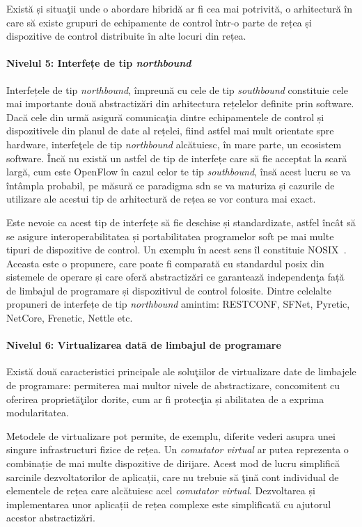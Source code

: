 Există și situaţii unde o abordare hibridă ar fi cea mai potrivită, o arhitectură în care să existe grupuri de echipamente de control într-o parte de rețea și dispozitive de control distribuite în alte locuri din rețea.

\paragraph{Nivelul 5: Interfețe de tip \textit{northbound}}

Interfețele de tip \textit{northbound}, împreună cu cele de tip \textit{southbound} constituie cele mai importante două abstractizări din arhitectura rețelelor definite prin software. Dacă cele din urmă asigură comunicaţia dintre echipamentele de control și dispozitivele din planul de date al rețelei, fiind astfel mai mult orientate spre hardware, interfeţele de tip \textit{northbound} alcătuiesc, în mare parte, un ecosistem software. Încă nu există un astfel de tip de interfețe care să fie acceptat la scară largă, cum este OpenFlow în cazul celor te tip \textit{southbound}, însă acest lucru se va întâmpla probabil, pe măsură ce paradigma \gls{sdn} se va maturiza și cazurile de utilizare ale acestui tip de arhitectură de rețea se vor contura mai exact.

Este nevoie ca acest tip de interfețe să fie deschise și standardizate, astfel încât să se asigure interoperabilitatea și portabilitatea programelor soft pe mai multe tipuri de dispozitive de control. Un exemplu în acest sens îl constituie NOSIX~\cite{wundsam2012nosix}. Aceasta este o propunere, care poate fi comparată cu standardul \gls{posix} din sistemele de operare și care oferă abstractizări ce garantează independenţa față de limbajul de programare și dispozitivul de control folosite. Dintre celelalte propuneri de interfețe de tip \textit{northbound} amintim: RESTCONF, SFNet, Pyretic, NetCore, Frenetic, Nettle etc.

\paragraph{Nivelul 6: Virtualizarea dată de limbajul de programare}

Există două caracteristici principale ale soluţiilor de virtualizare date de limbajele de programare: permiterea mai multor nivele de abstractizare, concomitent cu oferirea proprietăţilor dorite, cum ar fi protecţia și abilitatea de a exprima modularitatea.

Metodele de virtualizare pot permite, de exemplu, diferite vederi asupra unei singure infrastructuri fizice de rețea. Un \textit{comutator virtual} ar putea reprezenta o combinație de mai multe dispozitive de dirijare. Acest mod de lucru simplifică sarcinile dezvoltatorilor de aplicații, care nu trebuie să ţină cont individual de elementele de rețea care alcătuiesc acel \textit{comutator virtual}. Dezvoltarea și implementarea unor aplicații de rețea complexe este simplificată cu ajutorul acestor abstractizări.

